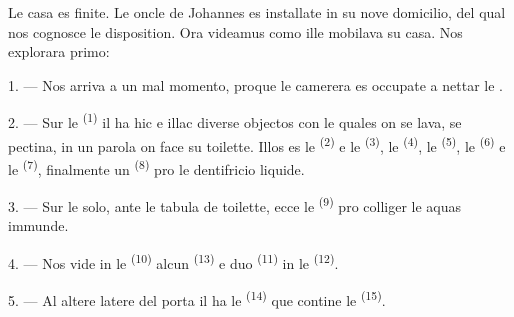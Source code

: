 %
%

\VUsaut{6.0mm}
\VUsaut{1.4mm}
\VUsaut{0.4mm}
\VUsaut{2.2mm}

Le casa es finite. Le oncle de Johannes es installate in su nove domicilio, del
qual nos cognosce le disposition. Ora videamus como ille mobilava su casa. Nos
explorara primo:

\VUsaut{3.0mm}

1. --- Nos arriva a un mal momento, proque le camerera es occupate a nettar le
.

2. --- Sur le  \textsuperscript{(1)} il ha hic e
illac diverse objectos con le quales on se lava, se pectina, in un parola on
face su toilette. Illos es le  \textsuperscript{(2)} e le
 \textsuperscript{(3)}, le 
\textsuperscript{(4)}, le  \textsuperscript{(5)}, le
 \textsuperscript{(6)} e le 
\textsuperscript{(7)}, finalmente un  \textsuperscript{(8)} pro
le dentifricio liquide.

3. --- Sur le solo, ante le tabula de toilette, ecce le 
\textsuperscript{(9)} pro colliger le aquas immunde.

4. --- Nos vide in le  \textsuperscript{(10)} alcun
 \textsuperscript{(13)} e duo 
\textsuperscript{(11)} in le 
\textsuperscript{(12)}.

5. --- Al altere latere del porta il ha le 
\textsuperscript{(14)} que contine le  \textsuperscript{(15)}.

